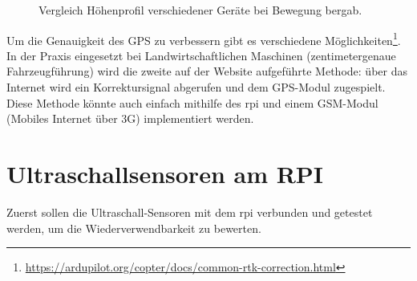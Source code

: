 \begin{figure}[h!]
    \centering
            
    \caption{Vergleich Höhenprofil verschiedener Geräte bei Bewegung bergab.}
    \label{fig:bench_gps_elevation}
\end{figure}

Um die Genauigkeit des GPS zu verbessern gibt es verschiedene Möglichkeiten\footnote{\url{https://ardupilot.org/copter/docs/common-rtk-correction.html}}. In der Praxis eingesetzt bei Landwirtschaftlichen Maschinen (zentimetergenaue Fahrzeugführung) wird die zweite auf der Website aufgeführte Methode: über das Internet wird ein Korrektursignal abgerufen und dem GPS-Modul zugespielt. Diese Methode könnte auch einfach mithilfe des \gls{rpi} und einem GSM-Modul (Mobiles Internet über 3G) implementiert werden.


\section{Ultraschallsensoren am RPI}
Zuerst sollen die Ultraschall-Sensoren mit dem \gls{rpi} verbunden und getestet werden, um die Wiederverwendbarkeit zu bewerten. %

